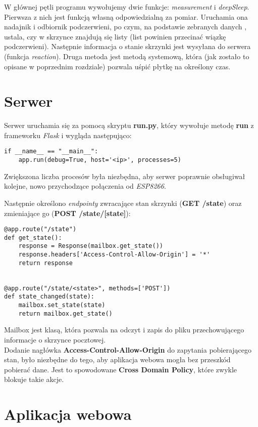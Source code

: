 W głównej pętli programu wywołujemy dwie funkcje: \emph{measurement} i \emph{deepSleep}. Pierwsza z nich jest funkcją własną odpowiedzialną za pomiar. Uruchamia ona nadajnik i odbiornik podczerwieni, po czym, na podstawie zebranych danych , ustala, czy w skrzynce znajdują się listy (list powinien przecinać wiązkę podczerwieni). Następnie informacja o stanie skrzynki jest wysyłana do serwera (funkcja \emph{reaction}). Druga metoda jest metodą systemową, która (jak zostało to opisane w poprzednim rozdziale) pozwala uśpić płytkę na określony czas.

\section{Serwer}

Serwer uruchamia się za pomocą skryptu \textbf{run.py}, który wywołuje metodę \textbf{run} z frameworku \textit{Flask} i wygląda następująco:

\begin{lstlisting}
if __name__ == "__main__":
    app.run(debug=True, host='<ip>', processes=5)
\end{lstlisting}

Zwiększona liczba procesów była niezbędna, aby serwer poprawnie obsługiwał kolejne, nowo przychodzące połączenia od \textit{ESP8266}.

Następnie określono \textit{endpointy} zwracające stan skrzynki (\textbf{GET /state}) oraz zmieniające go (\textbf{POST /state/[state]}):

\begin{lstlisting}
@app.route("/state")
def get_state():
    response = Response(mailbox.get_state())
    response.headers['Access-Control-Allow-Origin'] = '*'
    return response


@app.route("/state/<state>", methods=['POST'])
def state_changed(state):
    mailbox.set_state(state)
    return mailbox.get_state()
\end{lstlisting}

Mailbox jest klasą, która pozwala na odczyt i zapis do pliku przechowującego informacje o skrzynce pocztowej. \\

Dodanie nagłówka \textbf{Access-Control-Allow-Origin} do zapytania pobierającego stan, było niezbędne do tego, aby aplikacja webowa mogła bez przeszkód pobierać dane. Jest to spowodowane \textbf{Cross Domain Policy}, które zwykle blokuje takie akcje.

\section{Aplikacja webowa}

